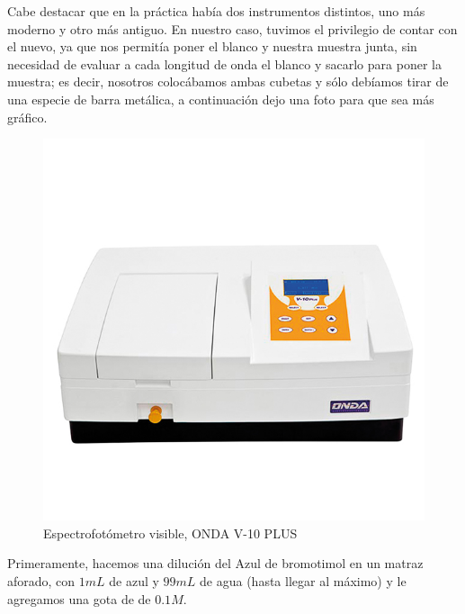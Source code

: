 
\noindent Cabe destacar que en la práctica había dos instrumentos distintos, uno más moderno y otro más antiguo. En nuestro caso, tuvimos el privilegio de contar con el nuevo, ya que nos permitía poner el blanco y nuestra muestra junta, sin necesidad de evaluar a cada longitud de onda el blanco y sacarlo para poner la muestra; es decir, nosotros colocábamos ambas cubetas y sólo debíamos tirar de una especie de barra metálica, a continuación dejo una foto para que sea más gráfico.

\vspace{0.4cm}

\begin{figure}[H]
    \centering
    \includegraphics[scale = 0.2]{fotos/SPTR-V01-001.jpg}
    \caption{Espectrofotómetro visible, ONDA V-10 PLUS}
    \label{fig:cris1}
\end{figure}

\vspace{0.4cm}


\noindent Primeramente, hacemos una dilución del Azul de bromotimol en un matraz aforado, con $1 mL$ de azul y $99 mL$ de agua (hasta llegar al máximo) y le agregamos una gota de de  $0.1M$.\\

